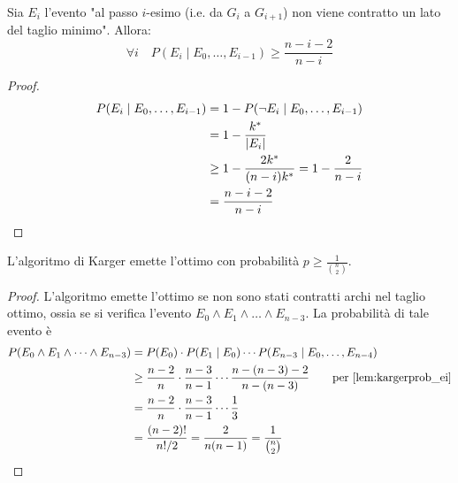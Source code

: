\begin{lemma}\label{lem:kargerprob_ei}
	Sia $E_i$ l'evento "al passo $i$-esimo (i.e. da $G_i$ a $G_{i+1}$) non viene contratto un lato del taglio minimo". Allora:
	\begin{equation*}
		\forall i \quad P(E_i \mid E_0, \dots, E_{i-1}) \geq \frac{n-i-2}{n-i}
	\end{equation*}
\end{lemma}
\begin{proof}
	\begin{align*}
		P(E_i \mid E_0,\dots,E_{i-1}) & = 1-P(\lnot E_i \mid E_0,\dots,E_{i -1})             \\
		                              & = 1-\frac{k^*}{| E_i |}                        \\
		                              & \geq 1-\frac{2k^*}{(n-i)k^*} = 1-\frac{2}{n-i} \\
		                              & = \frac{n-i-2}{n-i}
	\end{align*}
\end{proof}

\begin{theorem}
	L'algoritmo di Karger emette l'ottimo con probabilità $p \geq \frac{1}{{n\choose{2}}}$.
\end{theorem}
\begin{proof}
	L'algoritmo emette l'ottimo se non sono stati contratti archi nel taglio ottimo, ossia se si verifica l'evento $E_0\land E_1\land\dots\land E_{n-3}$. La probabilità di tale evento è
	\begin{align*}
		P(E_0\land E_1\land\dots\land E_{n-3}) & =P(E_0)\cdot P(E_1\mid E_0)\cdots P(E_{n-3}\mid E_0,\dots,E_{n-4})                                              \\
		                                       & \geq\frac{n-2}{n}\cdot\frac{n-3}{n-1}\cdots\frac{n-(n-3)-2}{n-(n-3)} \qquad \text{per \cref{lem:kargerprob_ei}} \\
		                                       & =\frac{n-2}{n}\cdot\frac{n-3}{n-1}\cdots\frac{1}{3}                                                             \\
		                                       & =\frac{(n-2)!}{n!/2}=\frac{2}{n(n-1)}=\frac{1}{\binom{n}{2}}
	\end{align*}
\end{proof}

